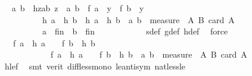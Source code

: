 \begin{isabellebody}
\ \isamarkupfalse%
\ a\ b\ \ hzab{\isacharcolon}{\kern0pt}\ {\isachardoublequoteopen}z\ {\isacharequal}{\kern0pt}\ {\isacharparenleft}{\kern0pt}a{\isacharcomma}{\kern0pt}\ b{\isacharparenright}{\kern0pt}{\isachardoublequoteclose}\ \ {\isachardoublequoteopen}f\ a\ {\isacharequal}{\kern0pt}\ y{\isachardoublequoteclose}\ \ {\isachardoublequoteopen}f\ b\ {\isacharequal}{\kern0pt}\ y{\isachardoublequoteclose}\ \ \isanewline
\ \ \ \ \ \ \ \ \ \ {\isachardoublequoteopen}h\ a\ {\isachargreater}{\kern0pt}\ h\ b\ {\isasymor}\ h\ a\ {\isacharequal}{\kern0pt}\ h\ b\ {\isasymand}\ {\isacharparenleft}{\kern0pt}a{\isacharcomma}{\kern0pt}\ b{\isacharparenright}{\kern0pt}\ {\isasymin}\ measure\ {\isacharparenleft}{\kern0pt}{\isasymlambda}\ {\isacharparenleft}{\kern0pt}A{\isacharcomma}{\kern0pt}\ B{\isacharparenright}{\kern0pt}{\isachardot}{\kern0pt}\ card\ A{\isacharparenright}{\kern0pt}{\isachardoublequoteclose}\ \ \isanewline
\ \ \ \ \ \ \ \ \ \ {\isachardoublequoteopen}a\ {\isasymin}\ {\isacharquery}{\kern0pt}fin{\isachardoublequoteclose}\ \ {\isachardoublequoteopen}b\ {\isasymin}\ {\isacharquery}{\kern0pt}fin{\isachardoublequoteclose}\isanewline
\ \ \ \ \ \ \ \ \ \ \isamarkupfalse%
\ s{\isacharunderscore}{\kern0pt}def\ g{\isacharunderscore}{\kern0pt}def\ h{\isacharunderscore}{\kern0pt}def\ \isamarkupfalse%
\ force\isanewline
\ \ \ \ \ \ \ \ \isamarkupfalse%
\ \isamarkupfalse%
\ {\isachardoublequoteopen}{}\ {\isacharasterisk}{\kern0pt}\ f\ a\ {\isacharminus}{\kern0pt}\ h\ a\ {\isacharless}{\kern0pt}\ {}\ {\isacharasterisk}{\kern0pt}\ f\ b\ {\isacharminus}{\kern0pt}\ h\ b\ {\isasymor}\ \isanewline
\ \ \ \ \ \ \ \ \ \ {}\ {\isacharasterisk}{\kern0pt}\ f\ a\ {\isacharminus}{\kern0pt}\ h\ a\ {\isacharequal}{\kern0pt}\ {}\ {\isacharasterisk}{\kern0pt}\ f\ b\ {\isacharminus}{\kern0pt}\ h\ b\ {\isasymand}\ {\isacharparenleft}{\kern0pt}a{\isacharcomma}{\kern0pt}\ b{\isacharparenright}{\kern0pt}\ {\isasymin}\ measure\ {\isacharparenleft}{\kern0pt}{\isasymlambda}\ {\isacharparenleft}{\kern0pt}A{\isacharcomma}{\kern0pt}\ B{\isacharparenright}{\kern0pt}{\isachardot}{\kern0pt}\ card\ A{\isacharparenright}{\kern0pt}{\isachardoublequoteclose}\ \isanewline
\ \ \ \ \ \ \ \ \ \ \isamarkupfalse%
\ hle{}f\ \isamarkupfalse%
\ {\isacharparenleft}{\kern0pt}smt\ {\isacharparenleft}{\kern0pt}verit{\isacharparenright}{\kern0pt}\ diff{\isacharunderscore}{\kern0pt}less{\isacharunderscore}{\kern0pt}mono{}\ le{\isacharunderscore}{\kern0pt}antisym\ nat{\isacharunderscore}{\kern0pt}less{\isacharunderscore}{\kern0pt}le{\isacharparenright}{\kern0pt}\isanewline

\end{isabellebody}
